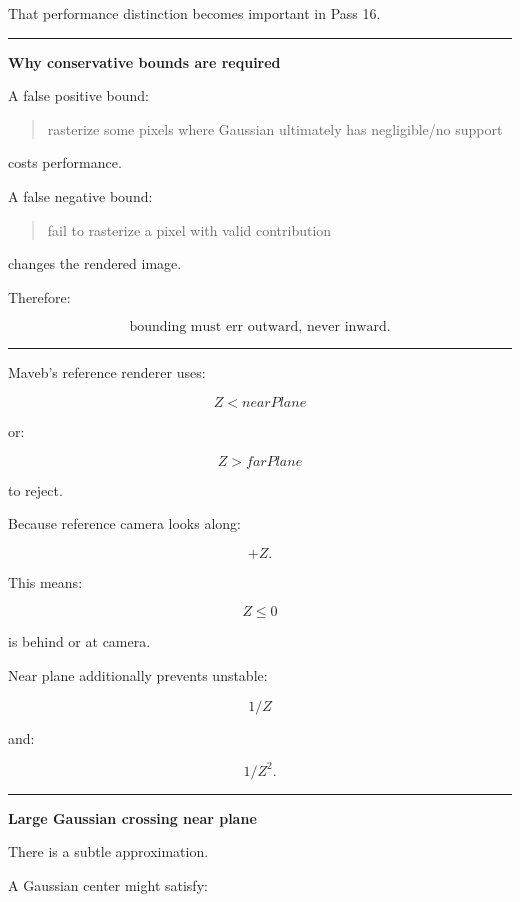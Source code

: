 That performance distinction becomes important in Pass 16.

\begin{center}\rule{0.5\linewidth}{0.5pt}\end{center}

\textbf{Why conservative bounds are required}

A false positive bound:

\begin{quote}
rasterize some pixels where Gaussian ultimately has negligible/no support
\end{quote}

costs performance.

A false negative bound:

\begin{quote}
fail to rasterize a pixel with valid contribution
\end{quote}

changes the rendered image.

Therefore:

\[
\boxed{
\text{bounding must err outward, never inward}.
}
\]

\begin{center}\rule{0.5\linewidth}{0.5pt}\end{center}

Maveb's reference renderer uses:

\[
Z<nearPlane
\]

or:

\[
Z>farPlane
\]

to reject.

Because reference camera looks along:

\[
+Z.
\]

This means:

\[
Z\le0
\]

is behind or at camera.

Near plane additionally prevents unstable:

\[
1/Z
\]

and:

\[
1/Z^2.
\]

\begin{center}\rule{0.5\linewidth}{0.5pt}\end{center}

\textbf{Large Gaussian crossing near plane}

There is a subtle approximation.

A Gaussian center might satisfy:

